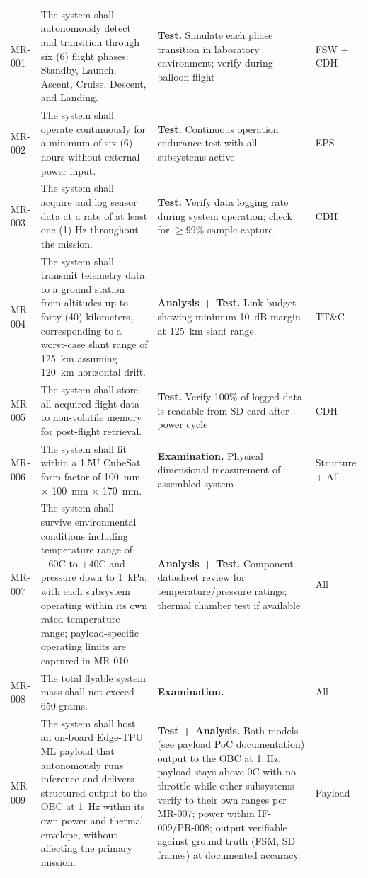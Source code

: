 \begin{landscape}
\begin{longtable}{p{1.4cm}p{8.2cm}p{10.2cm}p{1.9cm}}
MR-001 & The system shall autonomously detect and transition through six (6) flight phases: Standby, Launch, Ascent, Cruise, Descent, and Landing. & \textbf{Test.} Simulate each phase transition in laboratory environment; verify during balloon flight & FSW + CDH \\
MR-002 & The system shall operate continuously for a minimum of six (6) hours without external power input. & \textbf{Test.} Continuous operation endurance test with all subsystems active & EPS \\
MR-003 & The system shall acquire and log sensor data at a rate of at least one (1) Hz throughout the mission. & \textbf{Test.} Verify data logging rate during system operation; check for $\geq$99\% sample capture & CDH \\
MR-004 & The system shall transmit telemetry data to a ground station from altitudes up to forty (40) kilometers, corresponding to a worst-case slant range of 125~km assuming 120~km horizontal drift. & \textbf{Analysis + Test.} Link budget showing minimum 10~dB margin at 125~km slant range. & TT\&C \\
MR-005 & The system shall store all acquired flight data to non-volatile memory for post-flight retrieval. & \textbf{Test.} Verify 100\% of logged data is readable from SD card after power cycle & CDH \\
MR-006 & The system shall fit within a 1.5U CubeSat form factor of 100~mm $\times$ 100~mm $\times$ 170~mm. & \textbf{Examination.} Physical dimensional measurement of assembled system & Structure + All \\
MR-007 & The system shall survive environmental conditions including temperature range of $-60$\textdegree{}C to $+40$\textdegree{}C and pressure down to 1~kPa, with each subsystem operating within its own rated temperature range; payload-specific operating limits are captured in MR-010. & \textbf{Analysis + Test.} Component datasheet review for temperature/pressure ratings; thermal chamber test if available & All \\
MR-008 & The total flyable system mass shall not exceed 650 grams. & \textbf{Examination.} -- & All \\
MR-009 & The system shall host an on-board Edge-TPU ML payload that autonomously runs inference and delivers structured output to the OBC at 1~Hz within its own power and thermal envelope, without affecting the primary mission. & \textbf{Test + Analysis.} Both models (see payload PoC documentation) output to the OBC at 1~Hz; payload stays above 0\textdegree{}C with no throttle while other subsystems verify to their own ranges per MR-007; power within IF-009/PR-008; output verifiable against ground truth (FSM, SD frames) at documented accuracy. & Payload \\
\end{longtable}


\end{landscape}
